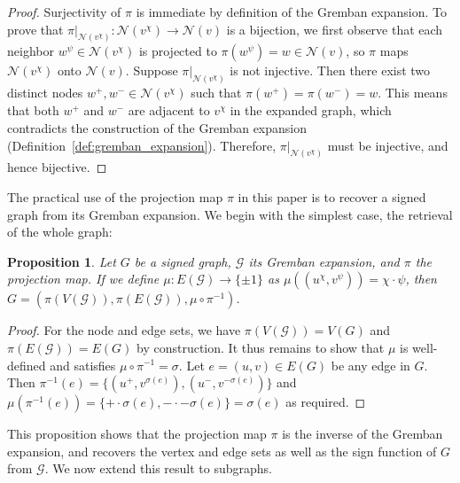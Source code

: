 \documentclass[reprint,onecolumn]{article}
\newtheorem{proposition}[theorem]{Proposition}
\newcommand{\1}{\mathbb{1}}
\newcommand{\0}{\mathbf{0}}
\begin{document}
\begin{proof}
Surjectivity of $\pi$ is immediate by definition of the Gremban expansion. To prove that \( \pi|_{\mathcal{N}(v^\chi)} : \mathcal{N}(v^\chi) \to \mathcal{N}(v) \) is a bijection, we first observe that each neighbor \( w^\psi \in \mathcal{N}(v^\chi) \) is projected to \( \pi(w^\psi) = w  \in \mathcal{N}(v) \), so \( \pi \) maps \( \mathcal{N}(v^\chi) \) onto \( \mathcal{N}(v) \).
Suppose \( \pi|_{\mathcal{N}(v^\chi)} \) is not injective. Then there exist two distinct nodes \( w^+, w^- \in \mathcal{N}(v^\chi) \) such that \( \pi(w^+) = \pi(w^-) = w \). This means that both \( w^+ \) and \( w^- \) are adjacent to \( v^\chi \) in the expanded graph, which contradicts the construction of the Gremban expansion (Definition~\ref{def:gremban_expansion}). Therefore, \( \pi|_{\mathcal{N}(v^\chi)} \) must be injective, and hence bijective. 
\end{proof}
The practical use of the projection map \( \pi \) in this paper is to recover a signed graph from its Gremban expansion. We begin with the simplest case, the retrieval of the whole graph:
\begin{proposition}\label{prop:projection_graph}
Let $G$ be a signed graph, $\mathcal{G}$ its Gremban expansion, and $\pi$ the projection map. If we define \( \mu : E(\mathcal{G}) \to \{\pm 1\} \) as \( \mu((u^\chi, v^\psi)) = \chi \cdot \psi \), then $G = (\pi(V(\mathcal{G})), \pi(E(\mathcal{G})), \mu \circ \pi^{-1})$.
\end{proposition}
\begin{proof}
For the node and edge sets, we have \( \pi(V(\mathcal{G})) = V(G) \) and $\pi(E(\mathcal{G}))=E(G)$ by construction. It thus remains to show that $\mu$ is well-defined and satisfies \( \mu \circ \pi^{-1} = \sigma \). Let $e=(u,v)\in E(G)$ be any edge in $G$. Then \( \pi^{-1}(e) = \{(u^+, v^{\sigma(e)}), (u^-, v^{-\sigma(e)})\} \) and $\mu(\pi^{-1}(e))=\{+\cdot \sigma(e),-\cdot-\sigma(e)\}=\sigma(e)$ as required.
\end{proof}
This proposition shows that the projection map $\pi$ is the inverse of the Gremban expansion, and recovers the vertex and edge sets as well as the sign function of $G$ from $\mathcal{G}$. We now extend this result to subgraphs.
\end{document}
